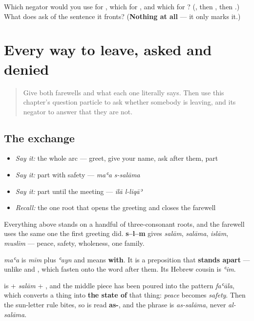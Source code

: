 \begin{tcolorbox}[breakable,colback=teal!4,colframe=teal!35!black,title={Before you move on}]
Which negator would you use for \textbf{ }, which for \textbf{}, and which for \textbf{}? (\textbf{}, then \textbf{}, then \textbf{}.) What does \textbf{} ask of the sentence it fronts? (\textbf{Nothing at all} — it only marks it.)
\end{tcolorbox}
\section[\texorpdfstring{\ar{مع} \ar{السلامة} · \ar{إلى} … (maʿa s-salāma …)}{مع السلامة · إلى … (maʿa s-salāma …)}]{Every way to leave, asked and denied}

\label{lesson:AR-R39-every-way-to-leave-again}



\begin{quote}
Give both farewells and what each one literally says. Then use this chapter's question particle to ask whether somebody is leaving, and its negator to answer that they are not.
\end{quote}

\subsection*{The exchange}
\begin{itemize}
\raggedright
  \item \emph{Say it:} the whole arc — greet, give your name, ask after them, part
  \item \emph{Say it:} part with safety — \emph{maʿa s-salāma}
  \item \emph{Say it:} part until the meeting — \emph{ilā l-liqāʾ}
  \item \emph{Recall:} the one root that opens the greeting and closes the farewell
\end{itemize}

Everything above stands on a handful of three-consonant roots, and the farewell uses the same one the first greeting did. \textbf{s–l–m} gives \emph{salām}, \emph{salāma}, \emph{islām}, \emph{muslim} — peace, safety, wholeness, one family.

\begin{grammarlens}[title={Grammar Lens: with, until, and the pattern between them}]
\textbf{} \emph{maʿa} is \emph{mīm} plus \emph{ʿayn} and means \textbf{with}. It is a preposition that \textbf{stands apart} — unlike \textbf{} and \textbf{}, which fasten onto the word after them. Its Hebrew cousin is \emph{ʿim}.

\textbf{} is \textbf{} + \emph{salām} + \textbf{}, and the middle piece has been poured into the pattern \emph{faʿāla}, which converts a thing into \textbf{the state of} that thing: \emph{peace} becomes \emph{safety}. Then the sun-letter rule bites, so \textbf{} is read \textbf{as-}, and the phrase is \emph{as-salāma}, never \emph{al-salāma}.
\end{grammarlens}

